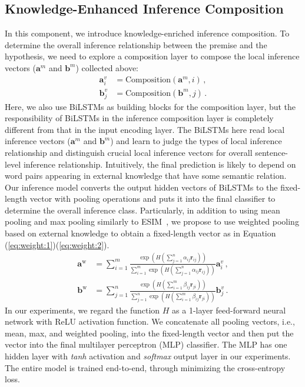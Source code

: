 \documentclass[11pt,a4paper]{article}
\newcommand{\vect}[1]{\bm{#1}}
\begin{document}
\subsection{Knowledge-Enhanced Inference Composition}
In this component, we introduce knowledge-enriched inference composition.
To determine the overall inference relationship between the premise and the hypothesis, we need to explore a composition layer to compose the local inference vectors (${\vect a}^m$ and ${\vect b}^m$) collected above:
\begin{align}
{\vect a}^v_i &= \mathrm{Composition}({\vect a}^m,i) \,, \\
{\vect b}^v_j &= \mathrm{Composition}({\vect b}^m,j) \,.
\end{align}
Here, we also use BiLSTMs as building blocks for the composition layer, but the responsibility of BiLSTMs in the inference composition layer is completely different from that in the input encoding layer. The BiLSTMs here read local inference vectors (${\vect a}^m$ and ${\vect b}^m$) and learn to judge the types of local inference relationship and distinguish crucial local inference vectors for overall sentence-level inference relationship. Intuitively, the final prediction is likely to depend on word pairs appearing in external knowledge that have some semantic relation.
Our inference model converts the output hidden vectors of BiLSTMs to the fixed-length vector with pooling operations and puts it into the final classifier to determine the overall inference class. Particularly, in addition to using mean pooling and max pooling similarly to ESIM~\citep{DBLP:conf/acl/ChenZLWJI17}, we propose to use weighted pooling based on external knowledge to obtain a fixed-length vector as in Equation (\ref{eq:weight:1})(\ref{eq:weight:2}).  
{\fontsize{10pt}{1.0cm}
\begin{align}
\label{eq:weight:1}
{\vect a}^{\mathrm{w}} &= \sum_{i=1}^m \frac{\exp(H(\sum_{j=1}^n \alpha_{ij}{\vect r}_{ij}))}{\sum_{i=1}^m\exp(H(\sum_{j=1}^n \alpha_{ij}{\vect r}_{ij}))} {\vect a}^v_i \,,\\
\label{eq:weight:2}
{\vect b}^{\mathrm{w}} &= \sum_{j=1}^n \frac{\exp(H(\sum_{i=1}^m \beta_{ij} {\vect r}_{ji}))}{\sum_{j=1}^n\exp(H(\sum_{i=1}^m \beta_{ij}{\vect r}_{ji}))} {\vect b}^v_j \,. 
\end{align}
}
In our experiments, we regard the function $H$ as a 1-layer feed-forward neural network with ReLU activation function. We concatenate all pooling vectors, i.e., mean, max, and weighted pooling, into the fixed-length vector and then put the vector into the final multilayer perceptron (MLP) classifier. The MLP has one hidden layer with \textit{tanh} activation and \textit{softmax} output layer in our experiments. The entire model is trained end-to-end, through minimizing the cross-entropy loss. 
\end{document}
